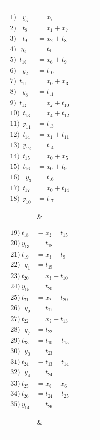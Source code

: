 {\scriptsize
\begin{tabular}{| c c | c c |} \hline
\parbox{0.2\linewidth}{%
\begin{align*}
1)\:\:\:\: y_5 & =  x_7\\ 
2)\:\:\:\: t_8 & =  x_1 + x_7\\ 
3)\:\:\:\: t_9 & =  x_2 + t_8\\ 
4)\:\:\: y_6 & =  t_9\\ 
5)\:\: t_{10} & =  x_6 + t_9\\ 
6)\:\:\:\: y_2 & =  t_{10}\\ 
7)\:\: t_{11} & =  x_0 + x_3\\ 
8)\:\:\:\: y_8 & =  t_{11}\\ 
9)\:\: t_{12} & =  x_2 + t_{10}\\ 
10)\:\: t_{13} & =  x_4 + t_{12}\\ 
11)\:\: y_{11} & =  t_{13}\\ 
12)\:\: t_{14} & =  x_1 + t_{11}\\ 
13)\:\: y_{12} & =  t_14\\ 
14)\:\: t_{15} & =  x_0 + x_5\\ 
15)\:\: t_{16} & =  x_0 + t_9\\ 
16)\:\:\:\: y_3 & =  t_{16}\\ 
17)\:\: t_{17} & =  x_0 + t_{14}\\
18)\:\: y_{10} & =  t_{17}
\end{align*}}
    & 
\parbox{0.2\linewidth}{%
\begin{align*}
19)\:t_{18} & =  x_2 + t_{15}\\ 
20)\:y_{13} & =  t_{18}\\ 
21)\:t_{19} & =  x_3 + t_9\\ 
22)\:\:\:y_1 & =  t_{19}\\ 
23)\:t_{20} & =  x_3 + t_{10}\\ 
24)\:y_{15} & =  t_{20}\\ 
25)\:t_{21} & =  x_2 + t_{20}\\ 
26)\:\:\:y_9 & =  t_{21}\\ 
27)\:t_{22} & =  x_5 + t_{13}\\ 
28)\:\:\:y_7 & =  t_{22}\\ 
29)\:t_{23} & =  t_{10} + t_{15}\\ 
30)\:\:\:y_0 & =  t_{23}\\ 
31)\:t_{24} & =  t_{13} + t_{14}\\ 
32)\:\:\:y_4 & =  t_{24}\\ 
33)\:t_{25} & =  x_0 + x_6\\ 
34)\:t_{26} & =  t_{24} + t_{25}\\ 
35)\:y_{14} & =  t_{26}
\end{align*}}
&  %


\end{tabular}}
